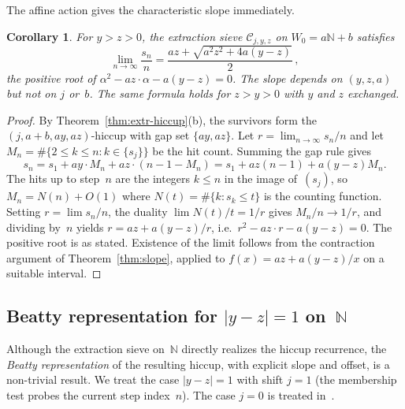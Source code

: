 \documentclass[11pt]{article}
\numberwithin{equation}{section}
\theoremstyle{plain}
\newtheorem{corollary}[theorem]{Corollary}
\theoremstyle{definition}
\theoremstyle{remark}
\newcommand{\N}{\mathbb{N}}
\begin{document}
The affine action gives the characteristic slope immediately.

\begin{corollary}\label{cor:slope-ab}
For $y>z>0$, the extraction sieve $\mathcal{C}_{j,y,z}$ on
$W_0=a\N+b$ satisfies
\[
  \lim_{n\to\infty}\frac{s_n}{n}
  = \frac{az+\sqrt{a^2z^2+4a(y-z)}}{2}\,,
\]
the positive root of $\alpha^2-az\cdot\alpha-a(y-z)=0$.
The slope depends on $(y,z,a)$ but not on $j$ or~$b$.
The same formula holds for $z>y>0$ with $y$ and $z$ exchanged.
\end{corollary}

\begin{proof}
By Theorem~\ref{thm:extr-hiccup}(b), the survivors form the
$(j,a{+}b,ay,az)$-hiccup with gap set $\{ay,az\}$.
Let $r=\lim_{n\to\infty}s_n/n$ and let $M_n=\#\{2\le k\le n:k\in\{s_j\}\}$
be the hit count.  Summing the gap rule gives
\[
  s_n = s_1 + ay\cdot M_n + az\cdot(n-1-M_n)
      = s_1 + az(n-1) + a(y-z)M_n.
\]
The hits up to step~$n$ are the integers $k\le n$ in the image
of~$(s_j)$, so $M_n=N(n)+O(1)$ where $N(t)=\#\{k:s_k\le t\}$
is the counting function.  Setting $r=\lim s_n/n$, the duality
$\lim N(t)/t=1/r$ gives $M_n/n\to 1/r$, and dividing by~$n$
yields $r=az+a(y-z)/r$, i.e.\ $r^2-az\cdot r-a(y-z)=0$.
The positive root is as stated.  Existence of the limit follows
from the contraction argument of Theorem~\ref{thm:slope},
applied to $f(x)=az+a(y-z)/x$ on a suitable interval.
\end{proof}

\subsection{Beatty representation for $|y-z|=1$ on~$\N$}\label{sec:beatty-extr}

Although the extraction sieve on~$\N$ directly realizes the hiccup recurrence, the
\emph{Beatty representation} of the resulting hiccup, with explicit
slope and offset, is a non-trivial result.  We treat the
case $|y-z|=1$ with shift $j=1$ (the membership test probes the
current step index~$n$).  The case $j=0$ is treated
in~\cite{Cloitre2025}.
\end{document}
